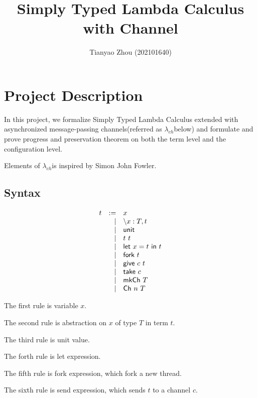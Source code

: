 \documentclass{article}
\title{Simply Typed Lambda Calculus with Channel}
\author{Tianyao Zhou (202101640)}
\newcommand{\lambdach}{$\lambda_{ch}$}
\newcommand{\sco}[1]{\textsf{#1}}
\newcommand{\lam}[3]{\backslash #1 : #2, #3}
\newcommand{\unit}{\sco{unit}}
\newcommand{\letin}[3]{\sco{let } #1 = #2 \sco{ in } #3}
\newcommand{\fork}[1]{\sco{fork }#1}
\newcommand{\give}[2]{\sco{give } #1\ #2}
\newcommand{\take}[1]{\sco{take } #1}
\newcommand{\mkch}[1]{\sco{mkCh } #1}
\newcommand{\channel}[2]{\sco{Ch }#1\ #2}
\begin{document}
\maketitle

\section{Project Description}

In this project, we formalize Simply Typed Lambda Calculus extended with asynchronized message-passing channels(referred as \lambdach below)
and formulate and prove progress and preservation theorem on both the term level and the configuration level.

Elements of \lambdach is inspired by Simon John Fowler\cite{fowler2019typed}.

\subsection{Syntax}

\begin{align*}
    \begin{array}[]{rrl}
        t & := & x                  \\
          &  | & \lam{x}{T}{t}      \\
          &  | & \unit              \\
          &  | & t\ t               \\
          &  | & \letin{x}{t}{t}    \\
          &  | & \fork{t}           \\
          &  | & \give{c}{t}        \\
          &  | & \take{c}           \\
          &  | & \mkch{T}           \\
          &  | & \channel{n}{T}
    \end{array}
\end{align*}

The first rule is variable $x$.

The second rule is abstraction on $x$ of type $T$ in term $t$.

The third rule is unit value.

The forth rule is let expression.

The fifth rule is fork expression, which fork a new thread.

The sixth rule is send expression, which sends $t$ to a channel $c$.
\end{document}
